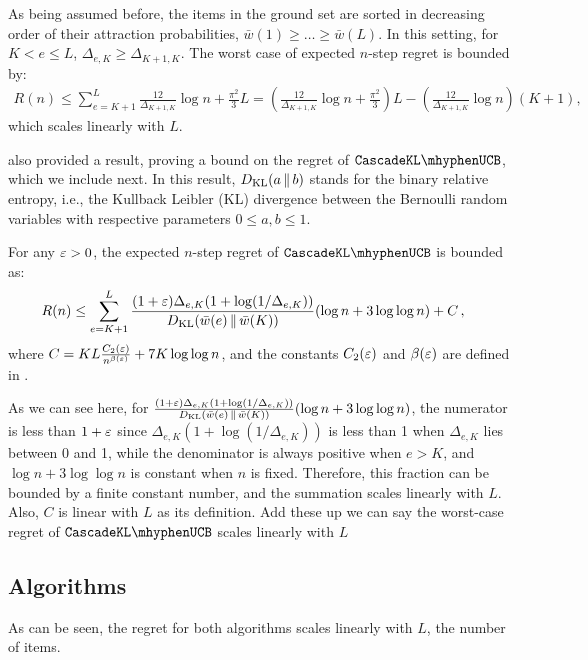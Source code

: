 As being assumed before, the items in the ground set are sorted in decreasing order of their attraction probabilities, $\bar{w}(1) \geq \ldots \geq \bar{w}(L)$. In this setting, for $K < e \leq L$, $\Delta_{e,K} \geq \Delta_{K+1,K}$. The worst case of expected $n$-step regret is bounded by:
\begin{align*}
 R(n) \leq \sum_{e = K + 1}^L \frac{12}{\Delta_{K+1, K}} \log n + \frac{\pi^2}{3} L 
 = (\frac{12}{\Delta_{K+1, K}} \log n + \frac{\pi^2}{3}) L - (\frac{12}{\Delta_{K+1, K}} \log n)(K+1) ,
\end{align*}
which scales linearly with $L$.

\citet{kveton15cascade}  also provided a result, proving a bound on the regret of $\cascadeklucb$, which we include next.
In this result, $D_\mathrm{KL}(a \,\|\, b)$ stands for the binary relative entropy, i.e., the Kullback Leibler (KL) divergence between the Bernoulli random variables with respective parameters $0\le a,b\le 1$.
\begin{theorem}
\label{thm:klucb} For any $\varepsilon > 0$, the expected $n$-step regret of $\cascadeklucb$ is bounded as:
\begin{align*}
  R(n)
  & \leq \sum_{e = K + 1}^L
  \frac{(1 + \varepsilon) \Delta_{e, K} (1 + \log(1 / \Delta_{e, K}))}{D_\mathrm{KL}(\bar{w}(e) \,\|\, \bar{w}(K))} (\log n + 3 \log \log n) + C\,,
\end{align*}
where $C = K L \frac{C_2(\varepsilon)}{n^{\beta(\varepsilon)}} + 7 K \log \log n$, and the constants $C_2(\varepsilon)$ and $\beta(\varepsilon)$ are defined in \citet{garivier11klucb}.
\end{theorem}

As we can see here, for $\frac{(1 + \varepsilon) \Delta_{e, K} (1 + \log(1 / \Delta_{e, K}))}{D_\mathrm{KL}(\bar{w}(e) \,\|\, \bar{w}(K))} (\log n + 3 \log \log n)$, 
the numerator is less than $1 + \varepsilon$ since $\Delta_{e, K} (1 + \log(1 / \Delta_{e, K}))$ is less than 1 when $\Delta_{e, K}$ lies between 0 and 1,
while the denominator is always positive when $e > K$, and $\log n + 3 \log \log n$ is constant when $n$ is fixed. Therefore, this fraction can be bounded by a finite constant number, and the summation scales linearly with $L$. Also, $C$ is linear with $L$ as its definition. Add these up we can say the worst-case regret of $\cascadeklucb$ scales linearly with $L$

\subsection{Algorithms}
\label{sec:algorithms}
As can be seen, the regret for both algorithms scales linearly with $L$, the number of items.

